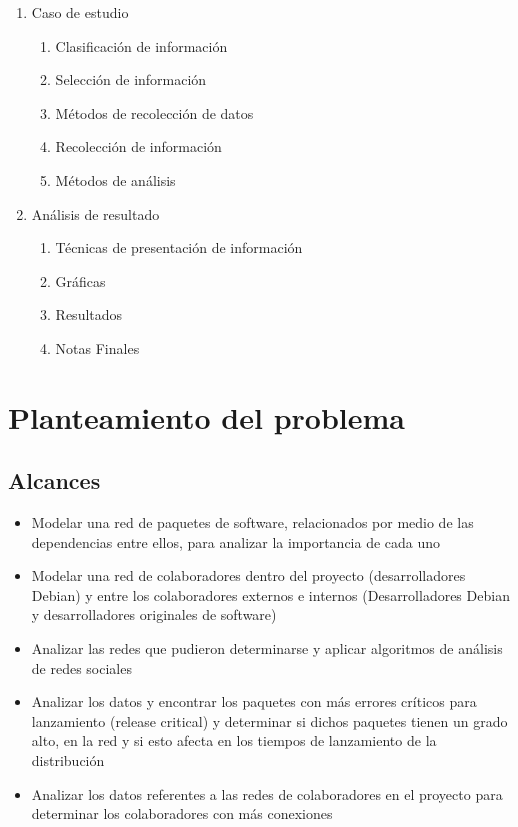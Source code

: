 \documentclass[12pt,titlepage]{report}
\begin{document}
\begin{enumerate}
\item Caso de estudio
  \begin{enumerate}
  \item Clasificación de información
  \item Selección de información
  \item Métodos de recolección de datos
  \item Recolección de información
  \item Métodos de análisis
  \end{enumerate}
\item Análisis de resultado
  \begin{enumerate}
  \item Técnicas de presentación de información
  \item Gráficas
  \item Resultados
  \item Notas Finales
  \end{enumerate}
\end{enumerate}

\chapter{Planteamiento del problema}
\section*{Alcances}
\begin{itemize}
\item Modelar una red de paquetes de software, relacionados por medio de las dependencias entre ellos, para analizar la importancia de cada uno
\item Modelar una red de colaboradores dentro del proyecto
  (desarrolladores Debian) y entre los colaboradores externos e
  internos (Desarrolladores Debian y desarrolladores originales de
  software)
\item Analizar las redes que pudieron determinarse y aplicar
  algoritmos de análisis de redes sociales
\item Analizar los datos y encontrar los paquetes con más errores
  críticos para lanzamiento (release critical) y determinar si dichos
  paquetes tienen un grado alto, en la red y si esto afecta en los
  tiempos de lanzamiento de la distribución
\item Analizar los datos referentes a las redes de colaboradores en el
  proyecto para determinar los colaboradores con más conexiones
\end{itemize}
\end{document}
